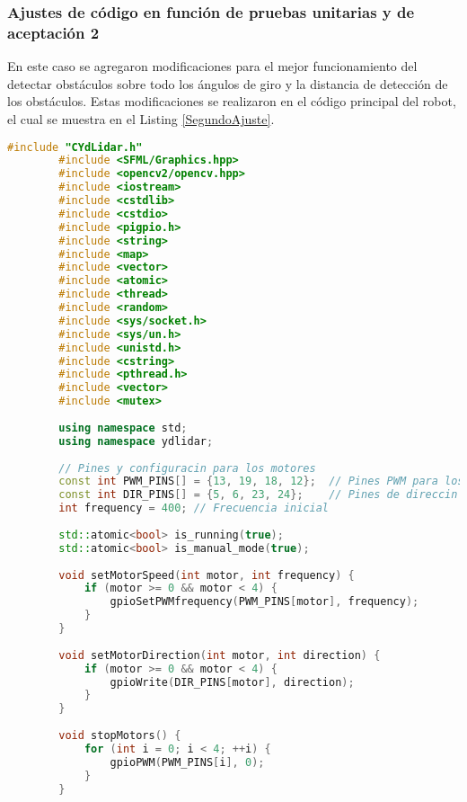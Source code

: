 \subsubsection{Ajustes de c\'odigo en funci\'on de pruebas unitarias y de aceptaci\'on 2} %
\label{ssub:Ajustes de c\'odigo en funci\'on de pruebas unitarias y de aceptaci\'on}
    En este caso se agregaron modificaciones para el mejor funcionamiento del detectar obst\'aculos
    sobre todo los \'angulos de giro y la distancia de detecci\'on de los obst\'aculos. Estas modificaciones
    se realizaron en el c\'odigo principal del robot, el cual se muestra en el Listing \ref{SegundoAjuste}.
    \begin{lstlisting}[language={C++}, caption={Segundo ajuste de c\'odigo}, label={SegundoAjuste}]
        #include "CYdLidar.h"
        #include <SFML/Graphics.hpp>
        #include <opencv2/opencv.hpp>
        #include <iostream>
        #include <cstdlib>
        #include <cstdio>
        #include <pigpio.h>
        #include <string>
        #include <map>
        #include <vector>
        #include <atomic>
        #include <thread>
        #include <random>
        #include <sys/socket.h>
        #include <sys/un.h>
        #include <unistd.h>
        #include <cstring>
        #include <pthread.h>
        #include <vector>
        #include <mutex>
        
        using namespace std;
        using namespace ydlidar;
        
        // Pines y configuracin para los motores
        const int PWM_PINS[] = {13, 19, 18, 12};  // Pines PWM para los motores
        const int DIR_PINS[] = {5, 6, 23, 24};    // Pines de direccin para los motores
        int frequency = 400; // Frecuencia inicial
        
        std::atomic<bool> is_running(true);
        std::atomic<bool> is_manual_mode(true);
        
        void setMotorSpeed(int motor, int frequency) {
            if (motor >= 0 && motor < 4) {
                gpioSetPWMfrequency(PWM_PINS[motor], frequency);
            }
        }
        
        void setMotorDirection(int motor, int direction) {
            if (motor >= 0 && motor < 4) {
                gpioWrite(DIR_PINS[motor], direction);
            }
        }
        
        void stopMotors() {
            for (int i = 0; i < 4; ++i) {
                gpioPWM(PWM_PINS[i], 0);
            }
        }
        

\end{lstlisting}
